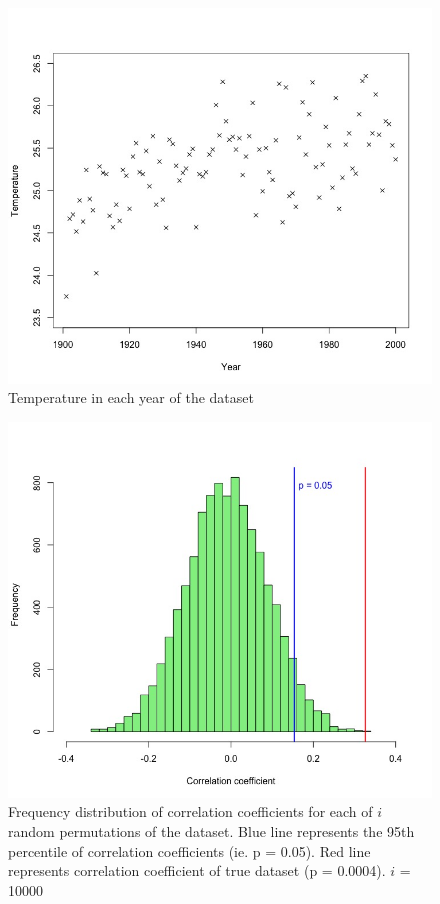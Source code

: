 \documentclass[12pt]{article}
\begin{document}
		
	\begin{figure}
		\includegraphics[width=\linewidth]{../Data/ats_yr_vs_temp.jpeg}				
		\caption{\label{fig:dataset} Temperature in each year of the dataset}
	\end{figure}
	
	\begin{figure}
		\includegraphics[width=\linewidth]{../Data/ats_corr_hist.jpeg}
		\caption{\label{fig:histogram} Frequency distribution of correlation coefficients for each of $i$ random permutations of the dataset. Blue line represents the 95th percentile of correlation coefficients (ie. p = 0.05). Red line represents correlation coefficient of true dataset (p = 0.0004). $i$ = 10000}
	\end{figure}
	
\end{document}

